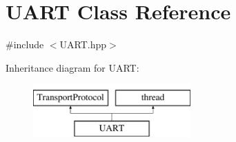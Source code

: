 \hypertarget{class_u_a_r_t}{}\section{U\+A\+R\+T Class Reference}
\label{class_u_a_r_t}


{\ttfamily \#include $<$U\+A\+R\+T.\+hpp$>$}

Inheritance diagram for U\+A\+R\+T\+:\begin{figure}[H]
\begin{center}
\leavevmode
\includegraphics[height=2.000000cm]{class_u_a_r_t}
\end{center}
\end{figure}
